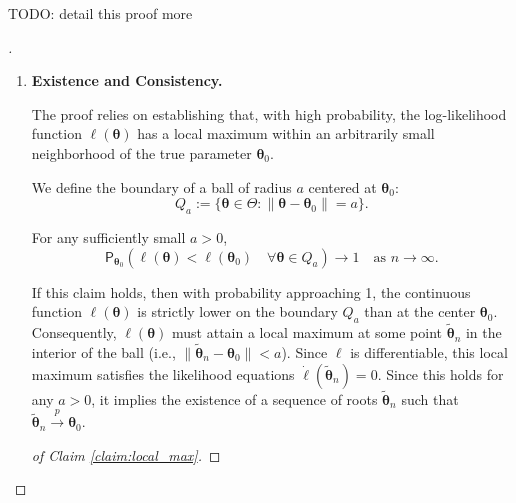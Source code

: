 TODO: detail this proof more
\begin{proof}[]
    \leavevmode
\begin{enumerate}
    \item \textbf{Existence and Consistency.}
    
    The proof relies on establishing that, with high probability, the log-likelihood function $\ell(\boldsymbol{\theta})$ has a local maximum within an arbitrarily small neighborhood of the true parameter $\boldsymbol{\theta}_0$.
    
    We define the boundary of a ball of radius $a$ centered at $\boldsymbol{\theta}_0$:
    \[ Q_a := \{\boldsymbol{\theta} \in \Theta : \|\boldsymbol{\theta} - \boldsymbol{\theta}_0\| = a\}. \]

    \begin{claim}[1]
    \label{claim:local_max}
    For any sufficiently small $a > 0$,
    \[ \mathsf{P}_{\boldsymbol{\theta}_0}(\ell(\boldsymbol{\theta}) < \ell(\boldsymbol{\theta}_0) \quad \forall \boldsymbol{\theta} \in Q_a) \longrightarrow 1 \quad \text{as } n \to \infty. \]
    \end{claim}
    
    If this claim holds, then with probability approaching 1, the continuous function $\ell(\boldsymbol{\theta})$ is strictly lower on the boundary $Q_a$ than at the center $\boldsymbol{\theta}_0$. Consequently, $\ell(\boldsymbol{\theta})$ must attain a local maximum at some point $\tilde{\boldsymbol{\theta}}_n$ in the interior of the ball (i.e., $\|\tilde{\boldsymbol{\theta}}_n - \boldsymbol{\theta}_0\| < a$). Since $\ell$ is differentiable, this local maximum satisfies the likelihood equations $\dot{\ell}(\tilde{\boldsymbol{\theta}}_n) = 0$.
    Since this holds for any $a > 0$, it implies the existence of a sequence of roots $\tilde{\boldsymbol{\theta}}_n$ such that $\tilde{\boldsymbol{\theta}}_n \stackrel{p}{\longrightarrow} \boldsymbol{\theta}_0$.

    \begin{proof}[of Claim \ref{claim:local_max}]
        
    

\end{proof}
\end{enumerate}
\end{proof}
